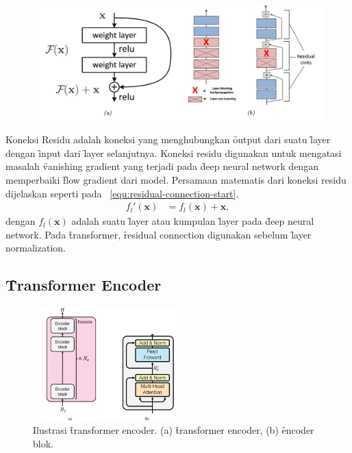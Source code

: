 	\begin{figure}
		\centering
		\includegraphics[width=1\textwidth]{assets/pics/residual-connection.png}
		\label{fig:residual-connection}
	\end{figure}
	Koneksi Residu adalah koneksi yang menghubungkan \f{output} dari suatu \f{layer} dengan \f{input} dari \f{layer} selanjutnya. Koneksi residu digunakan untuk mengatasi masalah \f{vanishing gradient} yang terjadi pada \f{deep neural network} dengan memperbaiki \f{flow gradient} dari model. Persamaan matematis dari koneksi residu dijelaskan seperti pada \equ~\ref{equ:residual-connection-start}.
	\begin{align}
		\label{equ:residual-connection-start}
		f_l'(\mathbf{x}) &= f_l(\mathbf{x}) + \mathbf{x},
	\end{align}
dengan $f_l(\mathbf{x})$ adalah suatu \f{layer} atau kumpulan \f{layer} pada \f{deep neural network}.
Pada \f{transformer}, \f{residual connection} digunakan sebelum \f{layer normalization}.

	\subsection{\f{Transformer Encoder}}
	\label{sec:encoder}

	\begin{figure}
		\centering
		\includegraphics[width=0.5\textwidth]{assets/pics/final-transformers-encoder.png}
		\caption{Ilustrasi \f{transformer encoder}. (a) \f{transformer encoder}, (b) \f{encoder} blok.}
		\label{fig:transformer-encoder}
	\end{figure}

